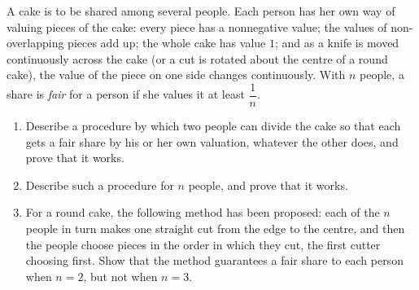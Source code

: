 A cake is to be shared among several people. Each person has her own way of valuing pieces of the cake: every piece has a nonnegative value; the values of non-overlapping pieces add up; the whole cake has value $1$; and as a knife is moved continuously across the cake (or a cut is rotated about the centre of a round cake), the value of the piece on one side changes continuously. With $n$ people, a share is \emph{fair} for a person if she values it at least $\dfrac{1}{n}$.
\begin{enumerate}
\item[(a)] Describe a procedure by which two people can divide the cake so that each gets a fair share by his or her own valuation, whatever the other does, and prove that it works.
\item[(b)] Describe such a procedure for $n$ people, and prove that it works.
\item[(c)] For a round cake, the following method has been proposed: each of the $n$ people in turn makes one straight cut from the edge to the centre, and then the people choose pieces in the order in which they cut, the first cutter choosing first. Show that the method guarantees a fair share to each person when $n=2$, but not when $n=3$.
\end{enumerate}
